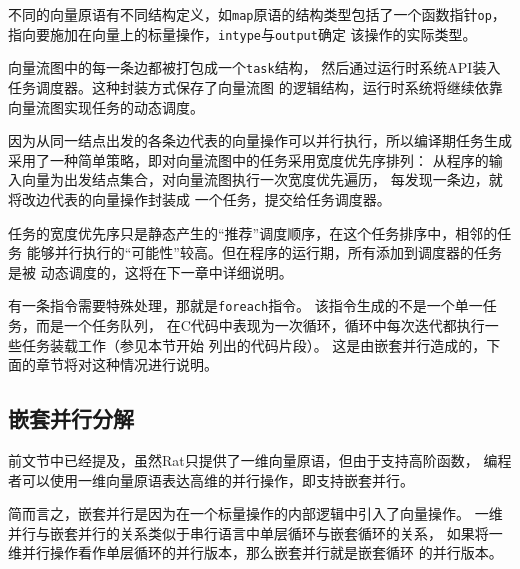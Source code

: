 不同的向量原语有不同结构定义，如\texttt{map}原语的结构类型包括了一个函数指针\texttt{op}，
指向要施加在向量上的标量操作，\texttt{intype}与\texttt{output}确定
该操作的实际类型。


向量流图中的每一条边都被打包成一个\texttt{task}结构，
然后通过运行时系统API装入任务调度器。这种封装方式保存了向量流图
的逻辑结构，运行时系统将继续依靠向量流图实现任务的动态调度。

因为从同一结点出发的各条边代表的向量操作可以并行执行，所以编译期任务生成
采用了一种简单策略，即对向量流图中的任务采用宽度优先序排列：
从程序的输入向量为出发结点集合，对向量流图执行一次宽度优先遍历，
每发现一条边，就将改边代表的向量操作封装成
一个任务，提交给任务调度器。

任务的宽度优先序只是静态产生的“推荐”调度顺序，在这个任务排序中，相邻的任务
能够并行执行的“可能性”较高。但在程序的运行期，所有添加到调度器的任务是被
动态调度的，这将在下一章中详细说明。

有一条指令需要特殊处理，那就是\texttt{foreach}指令。
该指令生成的不是一个单一任务，而是一个任务队列，
在C代码中表现为一次循环，循环中每次迭代都执行一些任务装载工作（参见本节开始
列出的代码片段）。
这是由嵌套并行造成的，下面的章节将对这种情况进行说明。

\subsection{嵌套并行分解}\label{subsec:np-decomposition}
前文节中已经提及，虽然Rat只提供了一维向量原语，但由于支持高阶函数，
编程者可以使用一维向量原语表达高维的并行操作，即支持嵌套并行。

简而言之，嵌套并行是因为在一个标量操作的内部逻辑中引入了向量操作。
一维并行与嵌套并行的关系类似于串行语言中单层循环与嵌套循环的关系，
如果将一维并行操作看作单层循环的并行版本，那么嵌套并行就是嵌套循环
的并行版本。
\begin{quotation}
\end{quotation}

